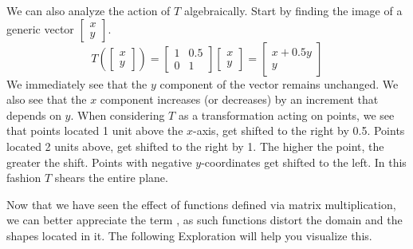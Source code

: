 \documentclass{ximera}
\begin{document}
We can also analyze the action of $T$ algebraically.  Start by finding the image of a generic vector $\begin{bmatrix}x\\y\end{bmatrix}$.
$$T\left(\begin{bmatrix}x\\y\end{bmatrix}\right)=\begin{bmatrix}1&0.5\\0&1\end{bmatrix}\begin{bmatrix}x\\y\end{bmatrix}=\begin{bmatrix}x+0.5y\\y\end{bmatrix}$$
We immediately see that the $y$ component of the vector remains unchanged.  We also see that the $x$ component increases (or decreases) by an increment that depends on $y$.  When considering $T$ as a transformation acting on points, we see that points located 1 unit above the $x$-axis, get shifted to the right by 0.5.  Points located 2 units above, get shifted to the right by 1. The higher the point, the greater the shift.  Points with negative $y$-coordinates get shifted to the left. In this fashion $T$ shears the entire plane.

 Now that we have seen the effect of functions defined via matrix multiplication, we can better appreciate the term , as such functions distort the domain and the shapes located in it.  The following Exploration will help you visualize this.
\end{document}
